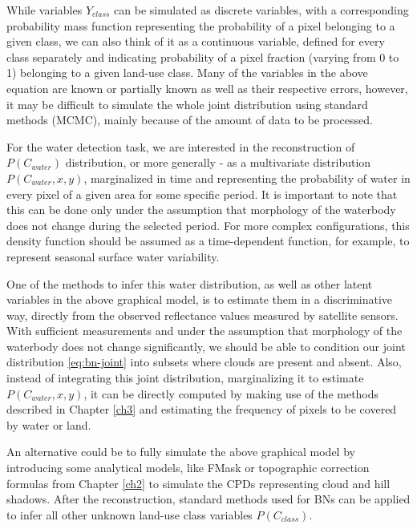 While variables $Y_{class}$ can be simulated as discrete variables, with a corresponding probability mass function representing the probability of a pixel belonging to a given class, we can also think of it as a continuous variable, defined for every class separately and indicating probability of a pixel fraction (varying from 0 to 1) belonging to a given land-use class. Many of the variables in the above equation are known or partially known as well as their respective errors, however, it may be difficult to simulate the whole joint distribution using standard methods (MCMC), mainly because of the amount of data to be processed.

For the water detection task, we are interested in the reconstruction of $P(C_{water})$ distribution, or more generally - as a multivariate distribution $P(C_{water}, x, y)$, marginalized in time and representing the probability of water in every pixel of a given area for some specific period. It is important to note that this can be done only under the assumption that morphology of the waterbody does not change during the selected period. For more complex configurations, this density function should be assumed as a time-dependent function, for example, to represent seasonal surface water variability. 

One of the methods to infer this water distribution, as well as other latent variables in the above graphical model, is to estimate them in a discriminative way, directly from the observed reflectance values measured by satellite sensors. With sufficient measurements and under the assumption that morphology of the waterbody does not change significantly, we should be able to condition our joint distribution \ref{eq:bn-joint} into subsets where clouds are present and absent. Also, instead of integrating this joint distribution, marginalizing it to estimate $P(C_{water}, x, y)$, it can be directly computed by making use of the methods described in Chapter \ref{ch3} and estimating the frequency of pixels to be covered by water or land.

An alternative could be to fully simulate the above graphical model by introducing some analytical models, like FMask or topographic correction formulas from Chapter \ref{ch2} to simulate the \glspl{CPD} representing cloud and hill shadows. After the reconstruction, standard methods used for \glspl{BN} can be applied to infer all other unknown land-use class variables $P(C_{class})$.


